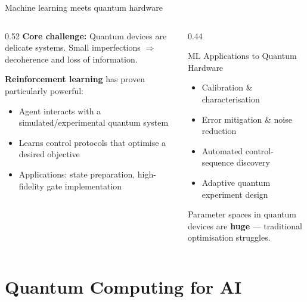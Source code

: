 \documentclass[aspectratio=169]{beamer}
\begin{document}
\begin{frame}{Machine learning meets quantum hardware}

  \begin{columns}[T]
    \begin{column}{0.52\textwidth}
      \textbf{Core challenge:} Quantum devices are delicate systems.
      Small imperfections $\Rightarrow$ decoherence and loss of information.

      \bigskip
      \textbf{Reinforcement learning} has proven particularly powerful:
      \begin{itemize}
        \item Agent interacts with a simulated/experimental quantum system
        \item Learns control protocols that optimise a desired objective
        \item Applications: state preparation, high-fidelity gate implementation
      \end{itemize}
    \end{column}
    \begin{column}{0.44\textwidth}
      \begin{block}{ML Applications to Quantum Hardware}
        \begin{itemize}
          \item Calibration \& characterisation
          \item Error mitigation \& noise reduction
          \item Automated control-sequence discovery
          \item Adaptive quantum experiment design
        \end{itemize}
      \end{block}
      \medskip
      \small Parameter spaces in quantum devices are \textbf{huge}
      — traditional optimisation struggles.
    \end{column}
  \end{columns}

\end{frame}

\section{Quantum Computing for AI}
\end{document}
